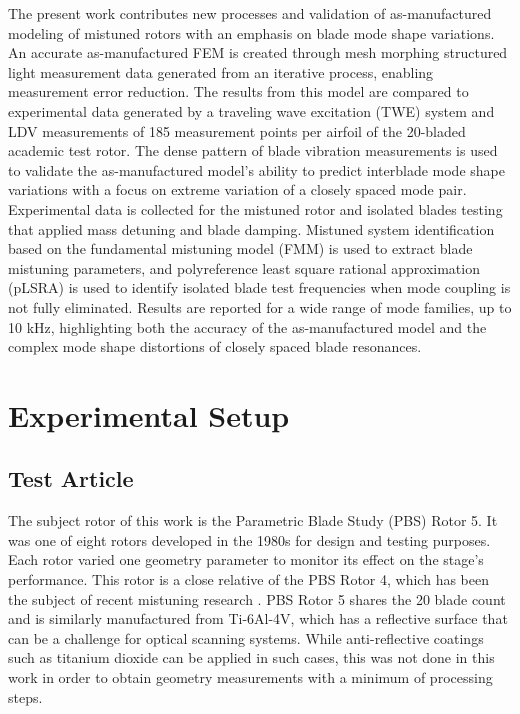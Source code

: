 \documentclass[colorlinks,upint,subscriptcorrection,varvw,hyphenate,balance,govt]{asmeconf}
\begin{document}
The present work contributes new processes and validation of as-manufactured modeling of mistuned rotors with an emphasis on blade mode shape variations. An accurate as-manufactured FEM is created through mesh morphing structured light measurement data generated from an iterative process, enabling measurement error reduction. The results from this model are compared to experimental data generated by a traveling wave excitation (TWE) system and LDV measurements of 185 measurement points per airfoil of the 20-bladed academic test rotor. The dense pattern of blade vibration measurements is used to validate the as-manufactured model's ability to predict interblade mode shape variations with a focus on extreme variation of a closely spaced mode pair. Experimental data is collected for the mistuned rotor and isolated blades testing that applied mass detuning and blade damping. Mistuned system identification based on the fundamental mistuning model (FMM)\cite{Feiner2002} is used to extract blade mistuning parameters, and polyreference least square rational approximation (pLSRA) is used to identify isolated blade test frequencies when mode coupling is not fully eliminated. Results are reported for a wide range of mode families, up to 10 kHz, highlighting both the accuracy of the as-manufactured model and the complex mode shape distortions of closely spaced blade resonances.

\section{Experimental Setup}

\subsection{Test Article}
The subject rotor of this work is the Parametric Blade Study (PBS) Rotor 5. It was one of eight rotors developed in the 1980s for design and testing purposes. Each rotor varied one geometry parameter to monitor its effect on the stage's performance. This rotor is a close relative of the PBS Rotor 4, which has been the subject of recent mistuning research \cite{Gillaugh2018, Gillaugh2019}. PBS Rotor 5 shares the 20 blade count and is similarly manufactured from Ti-6Al-4V, which has a reflective surface that can be a challenge for optical scanning systems. While anti-reflective coatings such as titanium dioxide can be applied in such cases, this was not done in this work in order to obtain geometry measurements with a minimum of processing steps.
\end{document}
